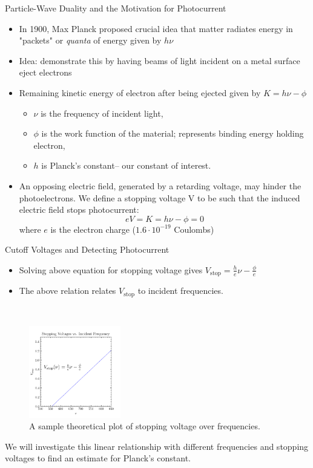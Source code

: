 \documentclass[hyperref=pdftex, presentation]{beamer}
\begin{document}
\begin{frame}{Particle-Wave Duality and the Motivation for Photocurrent}
 \small
 \begin{itemize}
  \item In 1900, Max Planck proposed crucial idea that matter radiates energy in "packets" or \textit{quanta} of energy given by $h\nu$
  \item Idea: demonstrate this by having beams of light incident on a metal surface eject electrons
  \item Remaining kinetic energy of electron after being ejected given by
   $K=h\nu-\phi$
    \begin{itemize}
    	\item $\nu$ is the frequency of incident light,
    	\item $\phi$ is the work function of the material; represents binding energy holding electron,
    	\item $h$ is Planck's constant-- our constant of interest.
    \end{itemize}
\item An opposing electric field, generated by a retarding voltage, may hinder the photoelectrons. We define a stopping voltage V to be such that the induced electric field stops photocurrent:
$$eV=K=h\nu-\phi=0$$ where $e$ is the electron charge ($1.6\cdot10^{-19}$ Coulombs)
 \end{itemize}
\end{frame}

\begin{frame}{\Large Cutoff Voltages and Detecting Photocurrent}

 \parbox{4in}{
 \begin{itemize}
  \item Solving above equation for stopping voltage gives
     $V_{\mathrm{stop}} = \frac{h}{e}\nu -\frac{\phi}{e}$
  \item The above relation relates $V_{\mathrm{stop}}$ to incident frequencies. 
 \end{itemize}
 }%
 ~~~~%

\begin{figure}
 \centering
 \parbox{4cm}{
 \includegraphics[width=4cm]{sample_stopping_volts.png}
 }
 \caption{A sample theoretical plot of stopping voltage over frequencies.}
\end{figure}

We will investigate this linear relationship with different frequencies and stopping voltages to find an estimate for Planck's constant. 

\end{frame}
\end{document}
